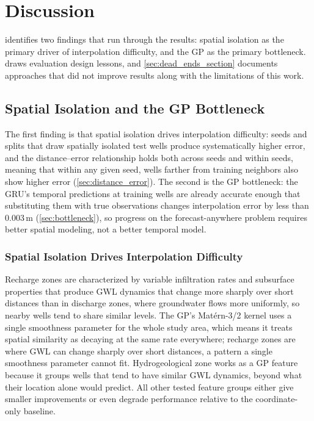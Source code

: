 
\chapter{Discussion}
\label{ch:discussion}

 identifies two findings that run through the results: spatial isolation as the primary driver of interpolation difficulty, and the GP as the primary bottleneck.  draws evaluation design lessons, and \cref{sec:dead_ends_section} documents approaches that did not improve results along with the limitations of this work.

\section{Spatial Isolation and the GP Bottleneck}
\label{sec:contributions_discussion}

The first finding is that spatial isolation drives interpolation difficulty: seeds and splits that draw spatially isolated test wells produce systematically higher error, and the distance--error relationship holds both across seeds and within seeds, meaning that within any given seed, wells farther from training neighbors also show higher error (\cref{sec:distance_error}). The second is the GP bottleneck: the GRU's temporal predictions at training wells are already accurate enough that substituting them with true observations changes interpolation error by less than 0.003\,m (\cref{sec:bottleneck}), so progress on the forecast-anywhere problem requires better spatial modeling, not a better temporal model.

\subsection{Spatial Isolation Drives Interpolation Difficulty}

Recharge zones are characterized by variable infiltration rates and subsurface properties that produce GWL dynamics that change more sharply over short distances than in discharge zones, where groundwater flows more uniformly, so nearby wells tend to share similar levels. The GP's Mat\'{e}rn-3/2 kernel uses a single smoothness parameter for the whole study area, which means it treats spatial similarity as decaying at the same rate everywhere; recharge zones are where GWL can change sharply over short distances, a pattern a single smoothness parameter cannot fit. Hydrogeological zone works as a GP feature because it groups wells that tend to have similar GWL dynamics, beyond what their location alone would predict. All other tested feature groups either give smaller improvements or even degrade performance relative to the coordinate-only baseline.

